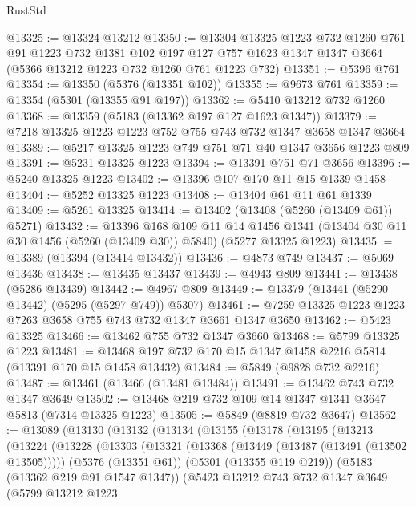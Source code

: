 \begin{lexlean}{RustStd}
\begin{coremodule}
@13325 := @13324 @13212
@13350 := @13304
    @13325
    @1223
    @732
    @1260
    @761
    @91
    @1223
    @732
    @1381
    @102
    @197
    @127
    @757
    @1623
    @1347
    @1347
    @3664
    (@5366 @13212 @1223 @732 @1260 @761 @1223 @732)
@13351 := @5396 @761
@13354 := @13350 (@5376 (@13351 @102))
@13355 := @9673 @761
@13359 := @13354 (@5301 (@13355 @91 @197))
@13362 := @5410 @13212 @732 @1260
@13368 := @13359 (@5183 (@13362 @197 @127 @1623 @1347))
@13379 := @7218 @13325 @1223 @1223 @752 @755 @743 @732 @1347 @3658 @1347 @3664
@13389 := @5217 @13325 @1223 @749 @751 @71 @40 @1347 @3656 @1223 @809
@13391 := @5231 @13325 @1223
@13394 := @13391 @751 @71 @3656
@13396 := @5240 @13325 @1223
@13402 := @13396 @107 @170 @11 @15 @1339 @1458
@13404 := @5252 @13325 @1223
@13408 := @13404 @61 @11 @61 @1339
@13409 := @5261 @13325
@13414 := @13402 (@13408 (@5260 (@13409 @61)) @5271)
@13432 := @13396
    @168
    @109
    @11
    @14
    @1456
    @1341
    (@13404 @30 @11 @30 @1456 (@5260 (@13409 @30)) @5840)
    (@5277 @13325 @1223)
@13435 := @13389 (@13394 (@13414 @13432))
@13436 := @4873 @749
@13437 := @5069 @13436
@13438 := @13435 @13437
@13439 := @4943 @809
@13441 := @13438 (@5286 @13439)
@13442 := @4967 @809
@13449 := @13379 (@13441 (@5290 @13442) (@5295 (@5297 @749)) @5307)
@13461 := @7259 @13325 @1223 @1223 @7263 @3658 @755 @743 @732 @1347 @3661 @1347 @3650
@13462 := @5423 @13325
@13466 := @13462 @755 @732 @1347 @3660
@13468 := @5799 @13325 @1223
@13481 := @13468 @197 @732 @170 @15 @1347 @1458 @2216 @5814 (@13391 @170 @15 @1458 @13432)
@13484 := @5849 (@9828 @732 @2216)
@13487 := @13461 (@13466 (@13481 @13484))
@13491 := @13462 @743 @732 @1347 @3649
@13502 := @13468 @219 @732 @109 @14 @1347 @1341 @3647 @5813 (@7314 @13325 @1223)
@13505 := @5849 (@8819 @732 @3647)
@13562 := @13089
    (@13130
      (@13132
        (@13134
          (@13155
            (@13178
              (@13195
                (@13213
                  (@13224
                    (@13228
                      (@13303
                        (@13321
                          (@13368 (@13449 (@13487 (@13491 (@13502 @13505)))))
                          (@5376 (@13351 @61))
                          (@5301 (@13355 @119 @219))
                          (@5183 (@13362 @219 @91 @1547 @1347))
                          (@5423
                            @13212
                            @743
                            @732
                            @1347
                            @3649
                            (@5799
                              @13212
                              @1223

\end{coremodule}
\end{lexlean}
